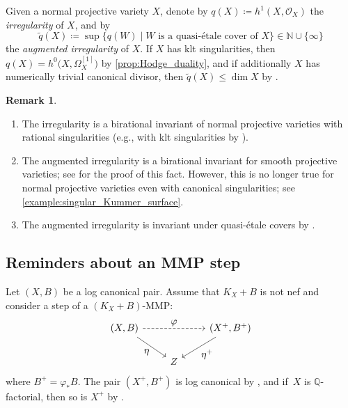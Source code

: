 \documentclass[10pt]{amsart}
\newcommand{\skpt}{\par\smallskip\noindent}
\let\ts\textstyle
\theoremstyle{plain}
\theoremstyle{definition}
\newtheorem{rem}[thm]{Remark}
\newcommand{\N}{\mathbb{N}}
\newcommand{\Q}{\mathbb{Q}}
\newcommand{\OO}{\mathcal{O}}
\begin{document}
Given a normal projective variety $X$, denote by
$q(X) \coloneqq h^1(X,\OO_X)$
the \emph{irregularity} of $ X $, and by
\[
\widetilde{q}(X) \coloneqq \sup \bigl\{ q(W) \mid W \text{ is a quasi-étale cover of } X \bigr\} \in \N \cup \{\infty\}
\]
the \emph{augmented irregularity} of $ X $.
If $X$ has klt singularities, then
$ q(X) = h^0 \bigl(X, \Omega_X^{[1]} \bigr) $
by \autoref{prop:Hodge_duality}, and if additionally $ X $ has numerically trivial canonical divisor, then $\widetilde{q}(X) \leq \dim X$ by \cite[Lem.\,2.19.2]{GGK19}.

\skpt
\begin{rem}
\label{rem:augmented_irreg}
\begin{enumerate}
\item\label{rem:augmented_irregi}
The irregularity is a birational invariant of normal projective varieties with rational singularities
(e.g., with klt singularities by \cite[Th.\,5.22]{KM98}).

\item\label{rem:augmented_irregii}
The augmented irregularity is a birational invariant for smooth projective varieties; see \cite[\S 2]{Anella21b} for the proof of this fact. However, this is no longer true for normal projective varieties even with canonical singularities; see \autoref{example:singular_Kummer_surface}.

\item\label{rem:augmented_irregiii}
The augmented irregularity is invariant under quasi-étale covers by \cite[Lem.\,2.19.1]{GGK19}.
\end{enumerate}
\end{rem}

\subsection{Reminders about an MMP step}
\label{subsection:MMP_step}

Let $(X,B)$ be a log canonical pair. Assume that $K_X + B$ is not nef and consider a step of a $(K_X+B)$-MMP:
\[
\begin{tikzcd}
(X, B) \arrow[dr, "\ts \eta" swap] \arrow[rr, "\ts \varphi", dashed] && (X^+, B^+) \arrow[dl, "\ts \eta^+"] \\
& Z
\end{tikzcd}
\]
where $B^+ = \varphi_* B$. The pair $(X^+, B^+)$ is log canonical by \cite[Lem.\,2.3.27]{Fuj17book}, and if~$X$ is $\Q$\nobreakdash-factorial, then so is $X^+$ by \cite[Prop.\,4.8.18 \& Prop.\,4.8.20]{Fuj17book}.
\end{document}
